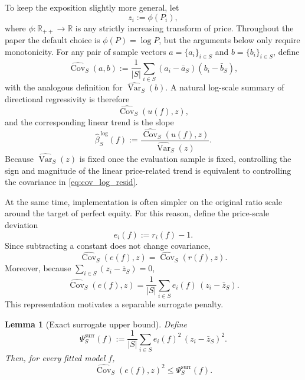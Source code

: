 \documentclass[12pt, draft]{article}
\newtheorem{lemma}{Lemma}
\theoremstyle{plain}
\theoremstyle{definition}
\newcommand{\1}{\mathbf{1}}
\begin{document}
To keep the exposition slightly more general, let
\[
z_i:=\phi(P_i),
\]
where $\phi:\mathbb{R}_{++}\to\mathbb{R}$ is any strictly increasing transform of price. Throughout the paper the default choice is $\phi(P)=\log P$, but the arguments below only require monotonicity. For any pair of sample vectors $a=\{a_i\}_{i\in S}$ and $b=\{b_i\}_{i\in S}$, define
\begin{equation}
\label{eq:sample_cov_general}
\widehat{\operatorname{Cov}}_S(a,b)
:=
\frac{1}{|S|}
\sum_{i\in S}
(a_i-\bar a_S)(b_i-\bar b_S),
\end{equation}
with the analogous definition for $\widehat{\operatorname{Var}}_S(b)$. A natural log-scale summary of directional regressivity is therefore
\begin{equation}
\label{eq:cov_log_resid}
\widehat{\operatorname{Cov}}_S(u(f),z),
\end{equation}
and the corresponding linear trend is the slope
\begin{equation}
\label{eq:sample_slope_logz}
\widehat\beta^{\,\log}_S(f)
:=
\frac{\widehat{\operatorname{Cov}}_S(u(f),z)}
{\widehat{\operatorname{Var}}_S(z)}.
\end{equation}
Because $\widehat{\operatorname{Var}}_S(z)$ is fixed once the evaluation sample is fixed, controlling the sign and magnitude of the linear price-related trend is equivalent to controlling the covariance in \eqref{eq:cov_log_resid}.

At the same time, implementation is often simpler on the original ratio scale around the target of perfect equity. For this reason, define the price-scale deviation
\[
e_i(f):=r_i(f)-1.
\]
Since subtracting a constant does not change covariance,
\[
\widehat{\operatorname{Cov}}_S(e(f),z)
=
\widehat{\operatorname{Cov}}_S(r(f),z).
\]
Moreover, because $\sum_{i\in S}(z_i-\bar z_S)=0$,
\begin{equation}
\label{eq:cov_linear_form}
\widehat{\operatorname{Cov}}_S(e(f),z)
=
\frac{1}{|S|}
\sum_{i\in S} e_i(f)\,(z_i-\bar z_S).
\end{equation}
This representation motivates a separable surrogate penalty.

\begin{lemma}[Exact surrogate upper bound]
\label{lem:surrogate_upper_bound}
Define
\begin{equation}
\label{eq:surrogate_penalty}
\Psi^{\mathrm{surr}}_S(f)
:=
\frac{1}{|S|}
\sum_{i\in S} e_i(f)^2\,(z_i-\bar z_S)^2.
\end{equation}
Then, for every fitted model $f$,
\begin{equation}
\label{eq:cov_surrogate_bound}
\widehat{\operatorname{Cov}}_S(e(f),z)^2
\le
\Psi^{\mathrm{surr}}_S(f).
\end{equation}
\end{lemma}
\end{document}
